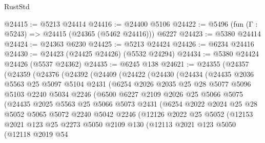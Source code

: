 \begin{lexlean}{RustStd}
\begin{coremodule}
@24415 := @5213 @24414
@24416 := @24400 @5106
@24422 := @5496 (fun (Γ : @5243) => @24415 (@24365 (@5462 @24416))) @6227
@24423 := @5380 @24414
@24424 := @24363 @6230
@24425 := @5213 @24424
@24426 := @6234 @24416
@24430 := @24423 (@24425 @24426) (@5532 @24294)
@24434 := @5380 @24424 @24426 (@5537 @24362)
@24435 := @6245 @138
@24621 := @24355
    (@24357
      (@24359
        (@24376
          (@24392
            (@24409
              (@24422
                (@24430
                  (@24434
                    (@24435
                      @2036
                      @5563
                      @25
                      @5097
                      @5104
                      @2431
                      (@6254
                        @2026
                        @2035
                        @25
                        @28
                        @5077
                        @5096
                        @5103
                        @2240
                        @5034
                        @2246
                        (@6500
                          @6227
                          @2109
                          @2026
                          @25
                          @5066
                          @5075
                          (@24435
                            @2025
                            @5563
                            @25
                            @5066
                            @5073
                            @2431
                            (@6254
                              @2022
                              @2024
                              @25
                              @28
                              @5052
                              @5065
                              @5072
                              @2240
                              @5042
                              @2246
                              (@12126
                                @2022
                                @25
                                @5052
                                (@12153
                                  @2021
                                  @123
                                  @25
                                  @2273
                                  @5050
                                  @2109
                                  @130
                                  (@12113
                                    @2021
                                    @123
                                    @5050
                                    (@12118
                                      @2019
                                      @54

\end{coremodule}
\end{lexlean}
